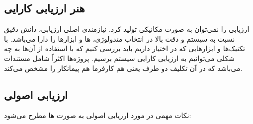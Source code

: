 \subsection{هنر ارزیابی کارایی}

ارزیابی را نمی‌توان به صورت مکانیکی تولید کرد. نیازمندی اصلی ارزیابی، دانش دقیق
نسبت به سیستم و دقت بالا در انتخاب متدولوژی، ها و ابزار‌ها را دارا
می‌باشد. با تکنیک‌ها و ابزار‌هایی که در اختیار داریم باید بررسی کنیم که با
استفاده از آن‌ها به چه شکلی می‌توانیم به ارزیابی کارایی سیستم برسیم. پروژه‌ها
اکثراً شامل مستندات  می‌باشد که در آن تکلیف دو طرف یعنی هم
کارفرما هم پیمانکار را مشخص می‌کند.

\subsection{ارزیابی اصولی}

نکات مهمی در مورد ارزیابی اصولی به صورت ها مطرح می‌شود:

